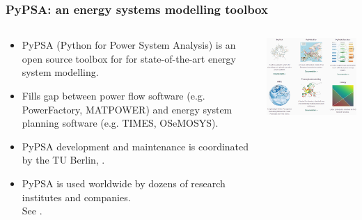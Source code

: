 \begin{frame}
  \frametitle{PyPSA: an energy systems modelling toolbox}

\begin{columns}[T]
\begin{column}{7cm}

{\small
  \begin{itemize}
  \item PyPSA (Python for Power System Analysis) is an open source toolbox 
  for for state-of-the-art energy system modelling.
  \item Fills gap between power flow software (e.g. PowerFactory,
  MATPOWER) and energy system planning software (e.g. TIMES, OSeMOSYS).
  \item PyPSA development and maintenance is coordinated by the TU Berlin,
  .  
  \item PyPSA is used worldwide by dozens of research institutes and companies.\\
  See .
  \end{itemize}
}

\end{column}

\begin{column}{9cm}

\centering
\includegraphics[width=8.5cm]{images/pypsa-web.png}

\end{column}
\end{columns}

\end{frame}



